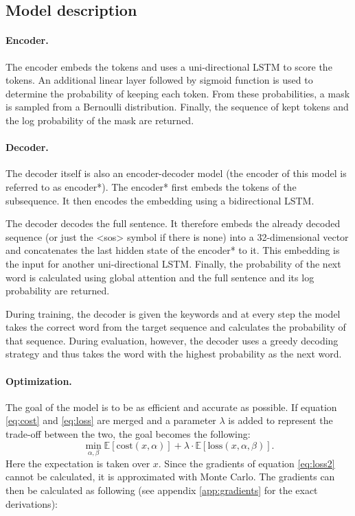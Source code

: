 \subsection{Model description}
\label{sec:model}
\paragraph{Encoder.} 
The encoder embeds the tokens and uses a uni-directional LSTM  to score the tokens.
An additional linear layer followed by sigmoid function is used to determine the probability of keeping each token. 
From these probabilities, a mask is sampled from a Bernoulli distribution. 
Finally, the sequence of kept tokens and the log probability of the mask are returned.

\paragraph{Decoder.} 
The decoder itself is also an encoder-decoder model (the encoder of this model is referred to as encoder*).
The encoder* first embeds the tokens of the subsequence.
It then encodes the embedding using a bidirectional LSTM. 

The decoder decodes the full sentence. 
It therefore embeds the already decoded sequence (or just the <sos> symbol if there is none) into a 32-dimensional vector and concatenates the last hidden state of the encoder* to it. 
This embedding is the input for another uni-directional LSTM. 
Finally, the probability of the next word is calculated using global attention  and the full sentence and its log probability are returned. 

During training, the decoder is given the keywords and at every step the model takes the correct word from the target sequence and calculates the probability of that sequence.
During evaluation, however, the decoder uses a greedy decoding strategy and thus takes the word with the highest probability as the next word. 

\paragraph{Optimization.} 
The goal of the model is to be as efficient and accurate as possible. 
If equation \ref{eq:cost} and \ref{eq:loss} are merged and a parameter $\lambda$ is added to represent the trade-off between the two, the goal becomes the following:
\begin{equation}
    \label{eq:loss2}
    \min_{\alpha, \beta} \mathbb{E} [\text{cost}(x, \alpha)] + \lambda \cdot \mathbb{E}[\text{loss}(x, \alpha, \beta)].
\end{equation}
Here the expectation is taken over $x$. 
Since the gradients of equation \ref{eq:loss2} cannot be calculated, it is approximated with Monte Carlo.
The gradients can then be calculated as following (see appendix \ref{app:gradients} for the exact derivations):

